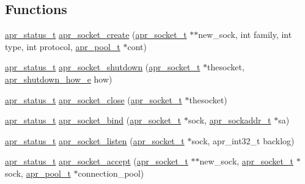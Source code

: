 \subsection*{Functions}
\begin{DoxyCompactItemize}
\item 
\hyperlink{group__apr__errno_gaf76ee4543247e9fb3f3546203e590a6c}{apr\+\_\+status\+\_\+t} \hyperlink{group__apr__network__io_ga46b81e267ef80e64510d4e83880a91bd}{apr\+\_\+socket\+\_\+create} (\hyperlink{group__apr__network__io_ga49262b223e7434746e1f1737659aa2c3}{apr\+\_\+socket\+\_\+t} $\ast$$\ast$new\+\_\+sock, int family, int type, int protocol, \hyperlink{group__apr__pools_gaf137f28edcf9a086cd6bc36c20d7cdfb}{apr\+\_\+pool\+\_\+t} $\ast$cont)
\item 
\hyperlink{group__apr__errno_gaf76ee4543247e9fb3f3546203e590a6c}{apr\+\_\+status\+\_\+t} \hyperlink{group__apr__network__io_gac5aea857a50c493f840c48b930abc48e}{apr\+\_\+socket\+\_\+shutdown} (\hyperlink{group__apr__network__io_ga49262b223e7434746e1f1737659aa2c3}{apr\+\_\+socket\+\_\+t} $\ast$thesocket, \hyperlink{group__apr__network__io_gae2130f1fa2d0db58c5c3c9c73d9b4009}{apr\+\_\+shutdown\+\_\+how\+\_\+e} how)
\item 
\hyperlink{group__apr__errno_gaf76ee4543247e9fb3f3546203e590a6c}{apr\+\_\+status\+\_\+t} \hyperlink{group__apr__network__io_ga88779f243ce19a2563544aee81894e6d}{apr\+\_\+socket\+\_\+close} (\hyperlink{group__apr__network__io_ga49262b223e7434746e1f1737659aa2c3}{apr\+\_\+socket\+\_\+t} $\ast$thesocket)
\item 
\hyperlink{group__apr__errno_gaf76ee4543247e9fb3f3546203e590a6c}{apr\+\_\+status\+\_\+t} \hyperlink{group__apr__network__io_ga512882c9979c2b9cad7cbc2508516d65}{apr\+\_\+socket\+\_\+bind} (\hyperlink{group__apr__network__io_ga49262b223e7434746e1f1737659aa2c3}{apr\+\_\+socket\+\_\+t} $\ast$sock, \hyperlink{structapr__sockaddr__t}{apr\+\_\+sockaddr\+\_\+t} $\ast$sa)
\item 
\hyperlink{group__apr__errno_gaf76ee4543247e9fb3f3546203e590a6c}{apr\+\_\+status\+\_\+t} \hyperlink{group__apr__network__io_ga154bcee918f6f01fe0373359dd74b0c4}{apr\+\_\+socket\+\_\+listen} (\hyperlink{group__apr__network__io_ga49262b223e7434746e1f1737659aa2c3}{apr\+\_\+socket\+\_\+t} $\ast$sock, apr\+\_\+int32\+\_\+t backlog)
\item 
\hyperlink{group__apr__errno_gaf76ee4543247e9fb3f3546203e590a6c}{apr\+\_\+status\+\_\+t} \hyperlink{group__apr__network__io_ga1d62711ca77ccc0f6413a298a47876da}{apr\+\_\+socket\+\_\+accept} (\hyperlink{group__apr__network__io_ga49262b223e7434746e1f1737659aa2c3}{apr\+\_\+socket\+\_\+t} $\ast$$\ast$new\+\_\+sock, \hyperlink{group__apr__network__io_ga49262b223e7434746e1f1737659aa2c3}{apr\+\_\+socket\+\_\+t} $\ast$sock, \hyperlink{group__apr__pools_gaf137f28edcf9a086cd6bc36c20d7cdfb}{apr\+\_\+pool\+\_\+t} $\ast$connection\+\_\+pool)

\end{DoxyCompactItemize}

